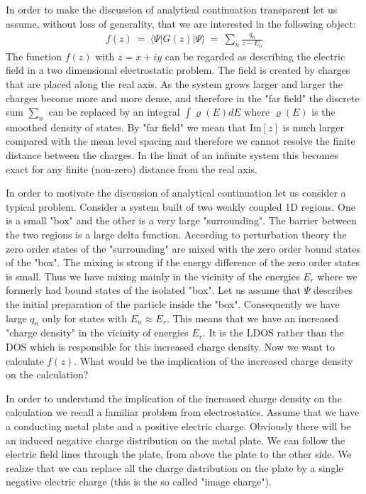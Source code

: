 \documentclass[onecolumn,fleqn, 11pt]{revtex4}
\newcommand{\im}{\mathrm{Im}}
\newcommand{\gdos}{\varrho} \newcommand{\EPS}{\mathcal{E}}
\newcommand{\beq}{\begin{eqnarray}}
\newcommand{\eeq}{\end{eqnarray}}
\begin{document}
In order to make the discussion of analytical continuation  
transparent let us assume, without loss of generality,    
that we are interested in the following object: 
\beq
f(z) \ = \  \langle \Psi |G(z)| \Psi \rangle 
\ = \ \sum_n \frac{q_n}{z-E_n} 
\eeq
The function $f(z)$ with $z=x+iy$ can be regarded 
as describing the electric field in a two dimensional  
electrostatic problem. The field is created by charges 
that are placed along the real axis.
As the system grows larger and larger the charges become 
more and more dense, and therefore in the "far field" 
the discrete sum $\sum_n$ can be replaced 
by an integral $\int \gdos(E)dE$ where $\gdos(E)$ 
is the smoothed density of states.  
By "far field" we mean that $\im[z]$ is much larger  
compared with the mean level spacing and therefore 
we cannot resolve the finite distance between the charges. 
In the limit of an infinite system this becomes exact for 
any finite (non-zero) distance from the real axis.


In order to motivate the discussion of analytical 
continuation let us consider a typical problem.
Consider a system built of two weakly coupled 1D regions. 
One is a small "box" and the other is a very large "surrounding". 
The barrier between the two regions is a large delta function.  
According to perturbation theory the zero order states 
of the "surrounding" are mixed with the zero order bound 
states of the "box". The mixing is strong if the energy 
difference of the zero order states is small. 
Thus we have mixing mainly in the vicinity 
of the energies $E_r$ where we formerly 
had bound states of the isolated "box". 
Let us assume that $\Psi$ describes the initial 
preparation of the particle inside the "box". 
Consequently we have large $q_n$ only for 
states with $E_n \approx E_r$.  
This means that we have an increased "charge density"  
in the vicinity of energies $E_r$. It is the LDOS rather 
than the DOS which is responsible for this increased 
charge density. Now we want to calculate $f(z)$. 
What would be the implication of the increased 
charge density on the calculation?


In order to understand the implication of the increased 
charge density on the calculation we recall a familiar 
problem from electrostatics. Assume that we have a conducting 
metal plate and a positive electric charge. Obviously there will 
be an induced negative charge distribution on the metal plate. 
We can follow the electric field lines through the plate, from above
the plate to the other side. We realize that we can replace all the
charge distribution on the plate by a single negative electric charge (this
is the so called "image charge").
\end{document}
